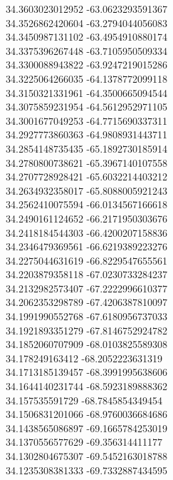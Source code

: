 {34.3603023012952	-63.0623293591367\\
34.3526862420604	-63.2794044056083\\
34.3450987131102	-63.4954910880174\\
34.3375396267448	-63.7105950509334\\
34.3300088943822	-63.9247219015286\\
34.3225064266035	-64.1378772099118\\
34.3150321331961	-64.3500665094544\\
34.3075859231954	-64.5612952971105\\
34.3001677049253	-64.7715690337311\\
34.2927773860363	-64.9808931443711\\
34.2854148735435	-65.1892730185914\\
34.2780800738621	-65.3967140107558\\
34.2707728928421	-65.6032214403212\\
34.2634932358017	-65.8088005921243\\
34.2562410075594	-66.0134567166618\\
34.2490161124652	-66.2171950303676\\
34.2418184544303	-66.4200207158836\\
34.2346479369561	-66.6219389223276\\
34.2275044631619	-66.8229547655561\\
34.2203879358118	-67.0230733284237\\
34.2132982573407	-67.2222996610377\\
34.2062353298789	-67.4206387810097\\
34.1991990552768	-67.6180956737033\\
34.1921893351279	-67.8146752924782\\
34.1852060707909	-68.0103825589308\\
34.178249163412	-68.2052223631319\\
34.1713185139457	-68.3991995638606\\
34.1644140231744	-68.5923189888362\\
34.157535591729	-68.7845854349454\\
34.1506831201066	-68.9760036684686\\
34.1438565086897	-69.1665784253019\\
34.1370556577629	-69.356314411177\\
34.1302804675307	-69.5452163018788\\
34.1235308381333	-69.7332887434595\\
}
